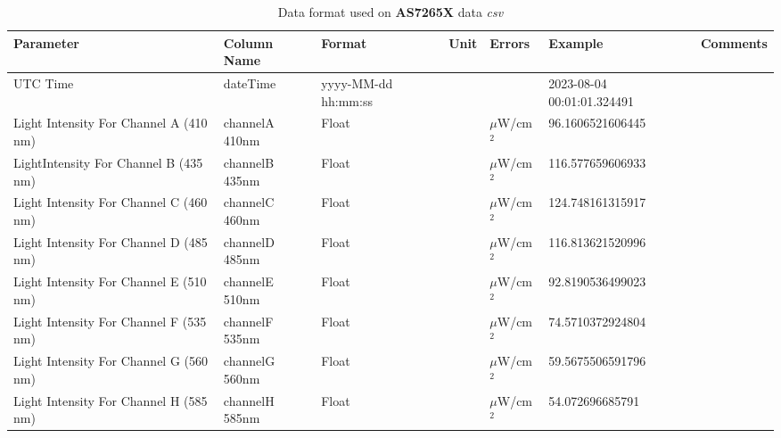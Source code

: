 \documentclass[12pt]{article}
\begin{document}
     \begin{table}[H]
            	\caption{Data format used on \textbf{AS7265X} data \emph{csv}}
            	 \label{t:dataFormatas7265}
            	\small
            	\begin{tabular}{||p{2cm}| p{2cm}|p{2cm}|p{1.5cm}|p{1.5cm}|p{2cm}|p{2cm}||}
            		\hline
            		\hline
            		Parameter & Column Name & Format & Unit & Errors & Example & Comments \\ 
                    \hline
                    \hline
            	    UTC Time & dateTime & yyyy-MM-dd hh:mm:ss & & & \tiny 2023-08-04 00:01:01.324491   &  \\
                    \hline
            		Light \hbox{Intensity} For Channel A (410 nm)  & channelA 410nm  & Float & 
                       &$\mu$W/cm$^{2}$  & \tiny  96.1606521606445 &   \\
                    \hline
            		  Light\hbox{Intensity} For Channel B (435 nm) & channelB 435nm  & Float & 
                       & $\mu$W/cm$^{2}$ & \tiny  116.577659606933 &   \\
                    \hline
            		  Light \hbox{Intensity} For Channel C (460 nm) & channelC 460nm  & Float & 
                       & $\mu$W/cm$^{2}$ & \tiny 124.748161315917 &   \\
                    \hline
            		Light \hbox{Intensity} For Channel D (485 nm) & channelD 485nm & Float & 
                       & $\mu$W/cm$^{2}$ & \tiny  116.813621520996 &   \\
                    \hline
            		  Light \hbox{Intensity} For Channel E (510 nm) & channelE 510nm  & Float & 
                       & $\mu$W/cm$^{2}$ & \tiny  92.8190536499023 &   \\
                    \hline
            		Light \hbox{Intensity} For Channel F (535 nm) & channelF 535nm  & Float & 
                       & $\mu$W/cm$^{2}$ & \tiny 74.5710372924804 &   \\
                    \hline
                    Light \hbox{Intensity} For Channel G (560 nm) & channelG 560nm & Float & 
                       & $\mu$W/cm$^{2}$ & \tiny  59.5675506591796 &   \\
                    \hline
            		  Light \hbox{Intensity} For Channel H (585 nm) & channelH 585nm & Float & 
                       & $\mu$W/cm$^{2}$ & \tiny 54.072696685791 &   \\

 
            	\hline
                    \hline
            	\end{tabular}
    \end{table} 
\end{document}
